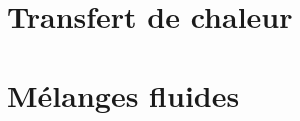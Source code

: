 \documentclass[10pt,a4paper,twocolumn,fleqn]{article}
\begin{document}
\section{Transfert de chaleur}\label{sec:heat}


\section{Mélanges fluides}


\nocite{*}


\end{document}
